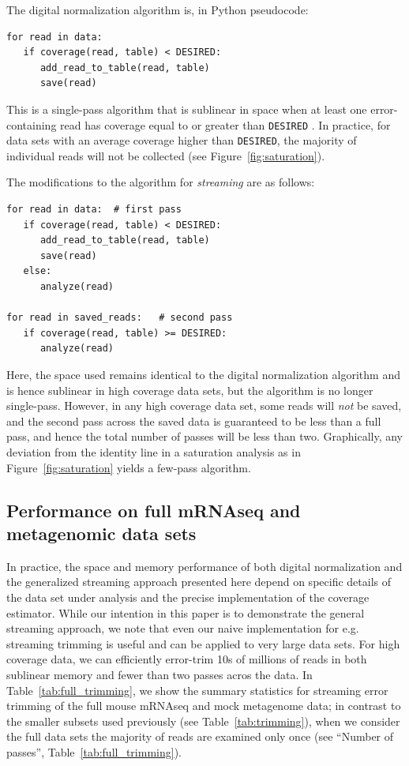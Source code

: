 \documentclass{article}
\begin{document}
The digital normalization algorithm is, in Python pseudocode:
\begin{verbatim}
for read in data:
   if coverage(read, table) < DESIRED:
      add_read_to_table(read, table)
      save(read)
\end{verbatim}
This is a single-pass algorithm that is sublinear in space when at
least one error-containing read has coverage equal to or greater than
{\tt DESIRED} \cite{Brown2012}. In practice, for data sets with an
average coverage higher than {\tt DESIRED}, the majority of individual
reads will not be collected (see Figure~\ref{fig:saturation}).

The modifications to the algorithm for {\em streaming} are as follows:
\begin{verbatim}
for read in data:  # first pass
   if coverage(read, table) < DESIRED:
      add_read_to_table(read, table)
      save(read)
   else:
      analyze(read)

for read in saved_reads:   # second pass
   if coverage(read, table) >= DESIRED:
      analyze(read)
\end{verbatim}

Here, the space used remains identical to the digital normalization
algorithm and is hence sublinear in high coverage data sets, but the
algorithm is no longer single-pass.  However, in any high coverage
data set, some reads will {\em not} be saved, and the second pass
across the saved data is guaranteed to be less than a full pass, and
hence the total number of passes will be less than two.  Graphically,
any deviation from the identity line in a saturation analysis as in
Figure~\ref{fig:saturation} yields a few-pass algorithm.

\subsection{Performance on full mRNAseq and metagenomic data sets}

In practice, the space and memory performance of both digital
normalization and the generalized streaming approach presented here
depend on specific details of the data set under analysis and the
precise implementation of the coverage estimator. While our intention
in this paper is to demonstrate the general streaming approach, we
note that even our naive implementation for e.g. streaming trimming is
useful and can be applied to very large data sets.  For high coverage
data, we can efficiently error-trim 10s of millions of reads in both
sublinear memory and fewer than two passes acros the data.  In
Table~\ref{tab:full_trimming}, we show the summary statistics for
streaming error trimming of the full mouse mRNAseq and mock metagenome
data; in contrast to the smaller subsets used previously (see
Table~\ref{tab:trimming}), when we consider the full data sets the
majority of reads are examined only once (see ``Number of passes'',
Table~\ref{tab:full_trimming}).
\end{document}
